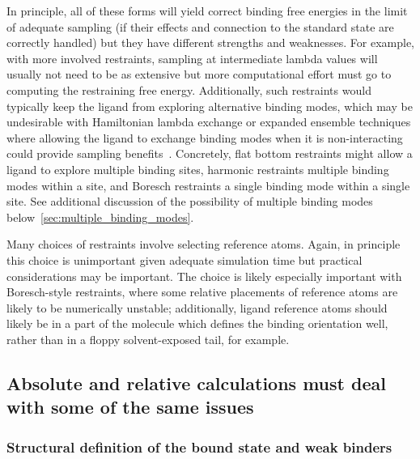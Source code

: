 \documentclass[9pt,bestpractices]{livecoms}
\begin{document}
In principle, all of these forms will yield correct binding free energies in the limit of adequate sampling (if their effects and connection to the standard state are correctly handled) but they have different strengths and weaknesses.
For example, with more involved restraints, sampling at intermediate lambda values will usually not need to be as extensive but more computational effort must go to computing the restraining free energy.
Additionally, such restraints would typically keep the ligand from exploring alternative binding modes, which may be undesirable with Hamiltonian lambda exchange or expanded ensemble techniques where allowing the ligand to exchange binding modes when it is non-interacting could provide sampling benefits~\cite{wang2013identifying}.
Concretely, flat bottom restraints might allow a ligand to explore multiple binding sites, harmonic restraints multiple binding modes within a site, and Boresch restraints a single binding mode within a single site.
See additional discussion of the possibility of multiple binding modes below~\ref{sec:multiple_binding_modes}.

Many choices of restraints involve selecting reference atoms.
Again, in principle this choice is unimportant given adequate simulation time but practical considerations may be important.
The choice is likely especially important with Boresch-style restraints, where some relative placements of reference atoms are likely to be numerically unstable; additionally, ligand reference atoms should likely be in a part of the molecule which defines the binding orientation well, rather than in a floppy solvent-exposed tail, for example.



\subsection*{Absolute and relative calculations must deal with some of the same issues}

\subsubsection*{Structural definition of the bound state and weak binders}
\end{document}
